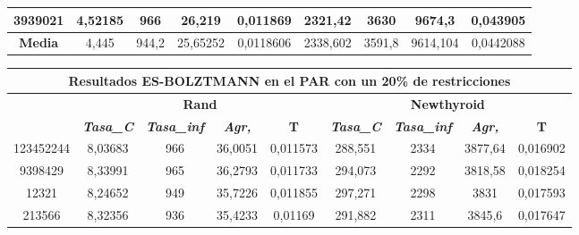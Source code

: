 \documentclass[12pt, spanish]{article}
\begin{document}
\begin{table}[H]
\begin{tabular}{|c|c|c|c|c|c|c|c|c|}
3939021           & 4,52185                   & 966                         & 26,219                 & 0,011869   & 2321,42                   & 3630                        & 9674,3                 & 0,043905   \\ \hline
\textbf{Media}    & 4,445                     & 944,2                       & 25,65252               & 0,0118606  & 2338,602                  & 3591,8                      & 9614,104               & 0,0442088  \\ \hline
\end{tabular}
\end{table}

\begin{table}[H]
\begin{tabular}{|c|c|c|c|c|c|c|c|c|}
\hline
\multicolumn{9}{|c|}{\textbf{Resultados ES-BOLZTMANN en el PAR con un 20\% de restricciones}}                                                                                                                     \\ \hline
\multirow{2}{*}{} & \multicolumn{4}{c|}{\textbf{Rand}}                                                            & \multicolumn{4}{c|}{\textbf{Newthyroid}}                                                      \\ \cline{2-9} 
                  & \textit{\textbf{Tasa\_C}} & \textit{\textbf{Tasa\_inf}} & \textit{\textbf{Agr,}} & \textbf{T} & \textit{\textbf{Tasa\_C}} & \textit{\textbf{Tasa\_inf}} & \textit{\textbf{Agr,}} & \textbf{T} \\ \hline
123452244         & 8,03683                   & 966                         & 36,0051                & 0,011573   & 288,551                   & 2334                        & 3877,64                & 0,016902   \\ \hline
9398429           & 8,33991                   & 965                         & 36,2793                & 0,011733   & 294,073                   & 2292                        & 3818,58                & 0,018254   \\ \hline
12321             & 8,24652                   & 949                         & 35,7226                & 0,011855   & 297,271                   & 2298                        & 3831                   & 0,017593   \\ \hline
213566            & 8,32356                   & 936                         & 35,4233                & 0,01169    & 291,882                   & 2311                        & 3845,6                 & 0,017647   \\ \hline

\end{tabular}
\end{table}
\end{document}
